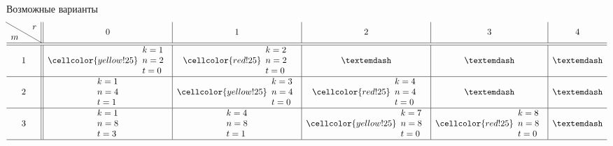 \documentclass[beameroptions={aspectratio=169}]{beamerswitch}
\begin{document}
\begin{frame}{Возможные варианты}
    \[\begin{array}{c || c | c | c | c | c }
        \hbox{\diagbox{$m$}{$r$}} & 0 & 1 & 2 & 3 & 4\\
        \hline\hline
        1 & \cellcolor{yellow!25}\begin{array}{l}k=1\\ n=2\\ t=0\end{array} & %
            \cellcolor{red!25}   \begin{array}{l}k=2\\ n=2\\ t=0\end{array} & %
            — &
            — &
            — \\\hline
        2 &                      \begin{array}{l}k=1\\ n=4\\ t=1\end{array} & %
            \cellcolor{yellow!25}\begin{array}{l}k=3\\ n=4\\ t=0\end{array} & %
            \cellcolor{red!25}   \begin{array}{l}k=4\\ n=4\\ t=0\end{array} & %
            — &
            — \\\hline
        3 &                      \begin{array}{l}k=1\\ n=8\\ t=3\end{array} & %
                                 \begin{array}{l}k=4\\ n=8\\ t=1\end{array} & %
            \cellcolor{yellow!25}\begin{array}{l}k=7\\ n=8\\ t=0\end{array} & %
            \cellcolor{red!25}   \begin{array}{l}k=8\\ n=8\\ t=0\end{array} & %
            — \\\hline

\end{array}\]
\end{frame}
\end{document}
